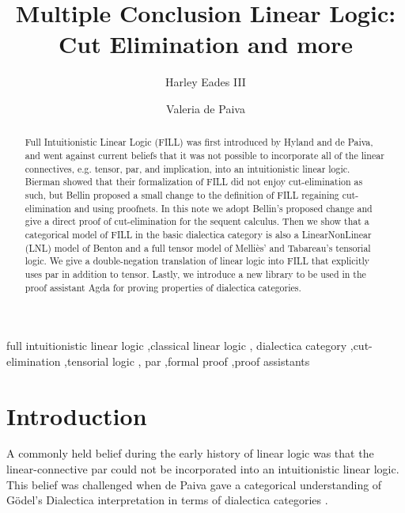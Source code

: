 \documentclass{elsarticle}
\title{Multiple Conclusion Linear Logic: \\ Cut Elimination and more}
\author[au]{Harley Eades III\corref{cor1}}
\author[nuance]{Valeria de Paiva}
\date{}
\begin{document}

\newcommand{\rcond}[0]{\refstepcounter{condCounter}\arabic{condCounter}}

\begin{abstract}
  Full Intuitionistic Linear Logic (FILL) was first introduced by
  Hyland and de Paiva, and went against current beliefs that it was
  not possible to incorporate all of the linear connectives,
  e.g. tensor, par, and implication, into an intuitionistic linear
  logic. Bierman showed that their formalization of FILL did not enjoy cut-elimination as such, but Bellin proposed a small change to the definition of FILL  regaining cut-elimination and using
  proofnets.  In this note we adopt Bellin's proposed change and give
  a direct proof of cut-elimination for the sequent calculus.  Then we
  show that a categorical model of FILL in the basic dialectica
  category is also a LinearNonLinear (LNL) model of Benton and a full
  tensor model of Melli\`es' and Tabareau's tensorial logic.  We give a double-negation translation of linear logic into FILL that
  explicitly uses par in addition to tensor.  Lastly, we introduce a
  new library to be used in the proof assistant Agda for proving
  properties of dialectica categories.
\end{abstract}

\begin{keyword}
full intuitionistic linear logic \sep classical linear logic \sep
dialectica category \sep cut-elimination \sep tensorial logic \sep
par \sep formal proof \sep proof assistants
\end{keyword}

\maketitle

\section{Introduction}
\label{sec:introduction}

A commonly held belief during the early history of linear logic was
that the linear-connective par could not be incorporated into an
intuitionistic linear logic.  This belief was challenged when de Paiva
gave a categorical understanding of G\"odel's Dialectica
interpretation in terms of dialectica categories
\cite{dePaiva:1987,dePaiva:1988}.  
\end{document}
